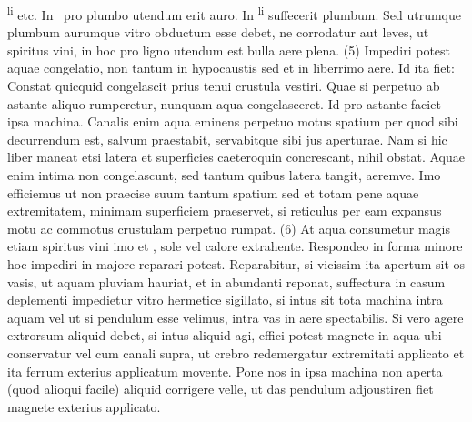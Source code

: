 \textsuperscript{li} etc. In \mercury\ pro plumbo\protect{} utendum erit auro\protect{}. In 
\textsuperscript{li} suffecerit plumbum\protect{}. Sed utrumque plumbum \protect{} aurumque \protect{} vitro obductum esse debet, ne corrodatur aut leves, ut spiritus vini\protect{}, in hoc pro ligno utendum est bulla  aere plena. 
(5) Impediri potest aquae congelatio, non
tantum in hypocaustis sed et in liberrimo aere. Id ita fiet: Constat quicquid congelascit prius tenui crustula vestiri. Quae si perpetuo ab astante aliquo rumperetur, nunquam aqua congelasceret. Id pro astante faciet ipsa machina. Canalis enim aqua eminens perpetuo motus spatium per quod sibi decurrendum est, salvum praestabit, servabitque sibi jus aperturae. Nam si hic liber maneat etsi latera et superficies caeteroquin concrescant, nihil  obstat. Aquae enim intima non congelascunt, sed tantum quibus latera tangit, aeremve. Imo efficiemus ut non praecise suum tantum spatium sed et totam pene aquae extremitatem, minimam superficiem praeservet, si reticulus per eam expansus  motu ac commotus crustulam perpetuo rumpat. (6) At aqua consumetur magis etiam spiritus vini\protect{} imo et \mercury, sole vel calore extrahente. Respondeo in forma minore  hoc impediri in majore reparari potest. Reparabitur, si vicissim ita apertum sit os vasis, ut aquam pluviam hauriat, et in abundanti reponat, suffectura in casum deplementi impedietur vitro hermetice sigillato, si intus sit tota machina intra aquam vel ut si pendulum\protect{} esse velimus, intra vas in aere spectabilis. Si vero agere extrorsum aliquid debet, si intus aliquid agi, effici potest magnete\protect{} in aqua ubi conservatur vel cum canali supra, ut crebro redemergatur extremitati applicato et ita ferrum\protect{} exterius applicatum movente. Pone nos in ipsa machina non aperta (quod alioqui facile) aliquid corrigere velle, ut das pendulum\protect{} adjoustiren fiet magnete\protect{} exterius applicato.
